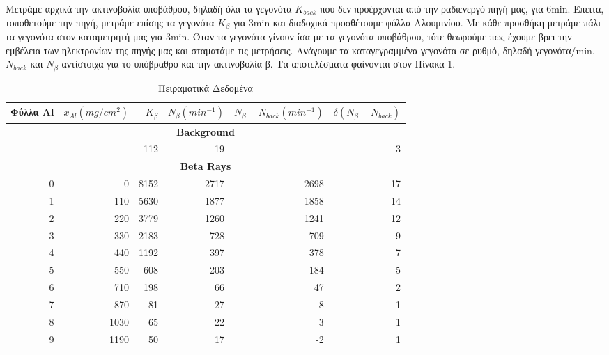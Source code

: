 \documentclass[a4paper]{article}
\begin{document}
	Μετράμε αρχικά την ακτινοβολία υποβάθρου, δηλαδή όλα τα γεγονότα $K_{back}$ που δεν προέρχονται από την ραδιενεργό πηγή μας, για 6min. 
	Έπειτα, τοποθετούμε την πηγή, μετράμε επίσης τα γεγονότα $K_\beta$ για 3min και διαδοχικά προσθέτουμε φύλλα Αλουμινίου. Με κάθε προσθήκη μετράμε πάλι τα γεγονότα στον καταμετρητή μας για 3min. Όταν τα γεγονότα γίνουν ίσα με τα γεγονότα υποβάθρου, τότε θεωρούμε πως έχουμε βρει την εμβέλεια των ηλεκτρονίων της πηγής μας και σταματάμε τις μετρήσεις.
	Ανάγουμε τα καταγεγραμμένα γεγονότα σε ρυθμό, δηλαδή γεγονότα/min, $N_{back}$ και $N_{\beta}$ αντίστοιχα για το υπόβραθρο και την ακτινοβολία β. Τα αποτελέσματα φαίνονται στον Πίνακα 1. 
		\begin{table}[h!]
			\centering
			\begin{tabular}{|*6r|}
				Φύλλα Al & $x_{Al}(mg/cm^2)$ & $K_\beta$ & $N_\beta (min^{-1})$ & $N_\beta - N_{back} (min^{-1})$ & $\delta(N_\beta-N_{back})$\footnotemark\\ 
				\midrule
				\multicolumn{6}{c}{\textbf{Background}}\\
				\midrule 
				- & - & 112 & 19 & - & 3 \\ 
				\midrule
				\multicolumn{6}{c}{\textbf{Beta Rays}}\\
				\midrule
				0&0&8152&2717&2698&17\\
1&110&5630&1877&1858&14\\
2&220&3779&1260&1241&12\\
3&330&2183&728&709&9\\
4&440&1192&397&378&7\\
5&550&608&203&184&5\\
6&710&198&66&47&2\\
7&870&81&27&8&1\\
8&1030&65&22&3&1\\
9&1190&50&17&-2&1
			\end{tabular}
		\caption{ Πειραματικά Δεδομένα}
		\end{table}
		
\end{document}
